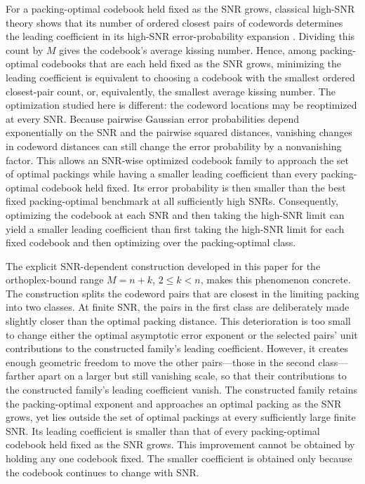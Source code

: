 \documentclass[12pt,draftclsnofoot,onecolumn]{IEEEtran}
\theoremstyle{definition}
\begin{document}
For a packing-optimal codebook held fixed as the SNR grows, classical
high-SNR theory shows that its number of ordered closest pairs of
codewords determines the leading coefficient in its high-SNR
error-probability expansion
\cite{Proakis2001,AlvaradoAgrellBrannstrom2018}.  Dividing this count by
\(M\) gives the codebook's average kissing number.  Hence, among
packing-optimal codebooks that are each held fixed as the SNR grows,
minimizing the leading coefficient is equivalent to choosing a codebook
with the smallest ordered closest-pair count, or, equivalently, the
smallest average kissing number.  The optimization studied here is
different: the codeword locations may be reoptimized at every SNR.
Because pairwise Gaussian error probabilities depend exponentially on
the SNR and the pairwise squared distances, vanishing changes in
codeword distances can still change the error probability by a
nonvanishing factor.  This allows an SNR-wise optimized codebook family
to approach the set of optimal packings while having a smaller leading
coefficient than every packing-optimal codebook held fixed.  Its error
probability is then smaller than the best fixed packing-optimal benchmark
at all sufficiently high SNRs.  Consequently, optimizing the codebook at
each SNR and then taking the high-SNR limit can yield a smaller leading
coefficient than first taking the high-SNR limit for each fixed codebook
and then optimizing over the packing-optimal class.



The explicit SNR-dependent construction developed in this paper for the
orthoplex-bound range \(M=n+k\), \(2\leq k<n\), makes this phenomenon
concrete.  The construction splits the codeword pairs that are closest in
the limiting packing into two classes.  At finite SNR, the pairs in the
first class are deliberately made slightly closer than the optimal packing
distance.
This deterioration is too small to change either the optimal asymptotic
error exponent or the selected pairs' unit contributions to the constructed
family's leading coefficient.  However, it creates enough geometric
freedom to move the other pairs---those in the second class---farther apart
on a larger but still vanishing scale, so that
their contributions to the constructed family's leading coefficient
vanish.  The constructed family retains the packing-optimal exponent and
approaches an optimal packing as the SNR grows, yet lies outside the set of
optimal packings at every sufficiently large finite SNR.  Its leading
coefficient is smaller than that of every packing-optimal codebook held
fixed as the SNR grows.   
This improvement cannot be obtained by holding any one codebook fixed.  The
smaller coefficient is
obtained only because the codebook continues to change with SNR.
\end{document}
